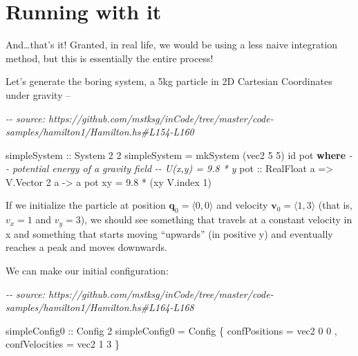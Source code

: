 \documentclass[]{article}
\newenvironment{Shaded}{}{}
\newcommand{\CommentTok}[1]{\textcolor[rgb]{0.38,0.63,0.69}{\textit{#1}}}
\newcommand{\DataTypeTok}[1]{\textcolor[rgb]{0.56,0.13,0.00}{#1}}
\newcommand{\DecValTok}[1]{\textcolor[rgb]{0.25,0.63,0.44}{#1}}
\newcommand{\FloatTok}[1]{\textcolor[rgb]{0.25,0.63,0.44}{#1}}
\newcommand{\FunctionTok}[1]{\textcolor[rgb]{0.02,0.16,0.49}{#1}}
\newcommand{\KeywordTok}[1]{\textcolor[rgb]{0.00,0.44,0.13}{\textbf{#1}}}
\newcommand{\NormalTok}[1]{#1}
\newcommand{\OperatorTok}[1]{\textcolor[rgb]{0.40,0.40,0.40}{#1}}
\newcommand{\OtherTok}[1]{\textcolor[rgb]{0.00,0.44,0.13}{#1}}
\begin{document}
\section{Running with it}\label{running-with-it}

And\ldots that's it! Granted, in real life, we would be using a less naive
integration method, but this is essentially the entire process!

Let's generate the boring system, a 5kg particle in 2D Cartesian Coordinates
under gravity --

\begin{Shaded}
\begin{Highlighting}[]
\CommentTok{{-}{-} source: https://github.com/mstksg/inCode/tree/master/code{-}samples/hamilton1/Hamilton.hs\#L154{-}L160}

\OtherTok{simpleSystem ::} \DataTypeTok{System} \DecValTok{2} \DecValTok{2}
\NormalTok{simpleSystem }\OtherTok{=}\NormalTok{ mkSystem (vec2 }\DecValTok{5} \DecValTok{5}\NormalTok{) }\FunctionTok{id}\NormalTok{ pot}
  \KeywordTok{where}
    \CommentTok{{-}{-} potential energy of a gravity field}
    \CommentTok{{-}{-} U(x,y) = 9.8 * y}
\OtherTok{    pot ::} \DataTypeTok{RealFloat}\NormalTok{ a }\OtherTok{=\textgreater{}} \DataTypeTok{V.Vector} \DecValTok{2}\NormalTok{ a }\OtherTok{{-}\textgreater{}}\NormalTok{ a}
\NormalTok{    pot xy }\OtherTok{=} \FloatTok{9.8} \OperatorTok{*}\NormalTok{ (xy }\OtherTok{\textasciigrave{}V.index\textasciigrave{}} \DecValTok{1}\NormalTok{)}
\end{Highlighting}
\end{Shaded}

If we initialize the particle at position
\(\mathbf{q}_0 = \langle 0, 0 \rangle\) and velocity
\(\mathbf{v}_0 = \langle 1, 3 \rangle\) (that is, \(v_x = 1\) and \(v_y
= 3\)), we should see something that travels at a constant velocity in x and
something that starts moving ``upwards'' (in positive y) and eventually reaches
a peak and moves downwards.

We can make our initial configuration:

\begin{Shaded}
\begin{Highlighting}[]
\CommentTok{{-}{-} source: https://github.com/mstksg/inCode/tree/master/code{-}samples/hamilton1/Hamilton.hs\#L164{-}L168}

\OtherTok{simpleConfig0 ::} \DataTypeTok{Config} \DecValTok{2}
\NormalTok{simpleConfig0 }\OtherTok{=} \DataTypeTok{Config}
\NormalTok{    \{ confPositions  }\OtherTok{=}\NormalTok{ vec2 }\DecValTok{0} \DecValTok{0}
\NormalTok{    , confVelocities }\OtherTok{=}\NormalTok{ vec2 }\DecValTok{1} \DecValTok{3}
\NormalTok{    \}}
\end{Highlighting}
\end{Shaded}
\end{document}
